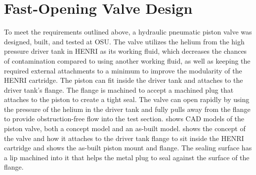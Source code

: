 \section{Fast-Opening Valve Design} \label{s:design}

To meet the requirements outlined above, a hydraulic pneumatic piston valve was designed, built, and tested at OSU. The valve utilizes the helium from the high pressure driver tank in HENRI as its working fluid, which decreases the chances of contamination compared to using another working fluid, as well as keeping the required external attachments to a minimum to improve the modularity of the HENRI cartridge. The piston can fit inside the driver tank and attaches to the driver tank's flange. The flange is machined to accept a machined plug that attaches to the piston to create a tight seal. The valve can open rapidly by using the pressure of the helium in the driver tank and fully pulls away from the flange to provide obstruction-free flow into the test section.  shows CAD models of the piston valve, both a concept model and an as-built model.  shows the concept of the valve and how it attaches to the driver tank flange to sit inside the HENRI cartridge and  shows the as-built piston mount and flange. The sealing surface has a lip machined into it that helps the metal plug to seal against the surface of the flange.

